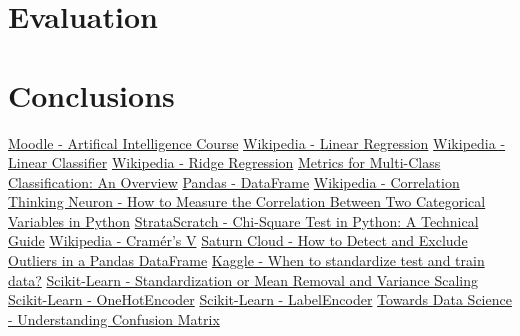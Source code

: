 \documentclass[runningheads]{paper}
\begin{document}

\section{Evaluation}

\section{Conclusions}


\pagebreak

\begin{thebibliography}{8}
    \bibitem{}
    \href{https://curs.upb.ro/2023/course/view.php?id=13749}{Moodle - Artifical Intelligence Course}
    \bibitem{}
    \href{https://en.wikipedia.org/wiki/Linear_regression}{Wikipedia - Linear Regression}
    \bibitem{}
    \href{https://en.wikipedia.org/wiki/Linear_classifier}{Wikipedia - Linear Classifier}
    \bibitem{}
    \href{https://en.wikipedia.org/wiki/Ridge_regression}{Wikipedia - Ridge Regression}
    \bibitem{}
    \href{https://www.semanticscholar.org/reader/2c9022fe0af15568a885e59d475ec8f95726e51b}{Metrics for Multi-Class Classification: An Overview}
    \bibitem{}
    \href{https://pandas.pydata.org/docs/reference/api/pandas.DataFrame.html}{Pandas - DataFrame}
    \bibitem{}
    \href{https://en.wikipedia.org/wiki/Correlation}{Wikipedia - Correlation}
    \bibitem{}
    \href{https://thinkingneuron.com/how-to-measure-the-correlation-between-two-categorical-variables-in-python/}{Thinking Neuron - How to Measure the Correlation Between Two Categorical Variables in Python}
    \bibitem{}
    \href{https://www.stratascratch.com/blog/chi-square-test-in-python-a-technical-guide/}{StrataScratch - Chi-Square Test in Python: A Technical Guide}
    \bibitem{}
    \href{https://en.wikipedia.org/wiki/Cram\%C3\%A9r\%27s\_V}{Wikipedia - Cramér's V}
    \bibitem{}
    \href{https://saturncloud.io/blog/how-to-detect-and-exclude-outliers-in-a-pandas-dataframe/}{Saturn Cloud - How to Detect and Exclude Outliers in a Pandas DataFrame}
    \bibitem{}
    \href{https://www.kaggle.com/discussions/questions-and-answers/159183}{Kaggle - When to standardize test and train data?}
    \bibitem{}
    \href{https://scikit-learn.org/stable/modules/preprocessing.html#standardization-or-mean-removal-and-variance-scaling}{Scikit-Learn - Standardization or Mean Removal and Variance Scaling}
    \bibitem{}
    \href{https://scikit-learn.org/stable/modules/generated/sklearn.preprocessing.OneHotEncoder.html}{Scikit-Learn - OneHotEncoder}
    \bibitem{}
    \href{https://scikit-learn.org/stable/modules/generated/sklearn.preprocessing.LabelEncoder.html}{Scikit-Learn - LabelEncoder}
    \bibitem{}
    \href{https://towardsdatascience.com/understanding-confusion-matrix-a9ad42dcfd62}{Towards Data Science - Understanding Confusion Matrix}
    
    \end{thebibliography}
\end{document}
